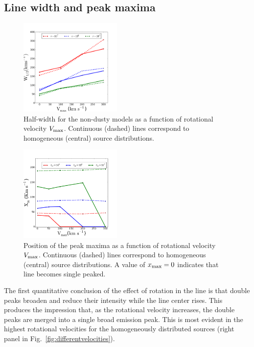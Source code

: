 \documentclass[usenatbib]{mn2e}
\newcommand{\ly}{{\ifmmode{{\rm Ly}\alpha~}\else{Ly$\alpha$~}\fi}}
\begin{document}
\subsection{Line width and peak maxima}
\label{sec:widthpeak}


\begin{figure}
    \includegraphics[width=0.45\textwidth]{WidthVvsVmax.png}
    \caption{Half-width for the non-dusty models as a function of
      rotational velocity $V_{\rm max}$. Continuous (dashed) lines
      correspond to homogeneous (central) source
      distributions. \label{fig:widthvsvelocity}} 
\end{figure}


\begin{figure}
    \includegraphics[width=0.45\textwidth]{maximumVvsVmax.png}
\caption{Position of the peak maxima as a function of rotational
  velocity $V_{\rm max}$. Continuous (dashed) lines correspond to
  homogeneous (central) source distributions. A value of $x_{\rm
    max}=0$ indicates that line becomes single
  peaked. \label{fig:maximumsvsvelocity}}  
\end{figure}

The first quantitative conclusion of the effect of rotation in the
\ly line is that double peaks broaden and reduce their intensity
while the line center rises. This produces the impression that, as the
rotational velocity increases, the double peaks are merged into a
single broad emission peak. This is most evident in the highest
rotational velocities for the homogeneously distributed sources
(right panel in Fig.~\ref{fig:differentvelocities}). 
\end{document}
